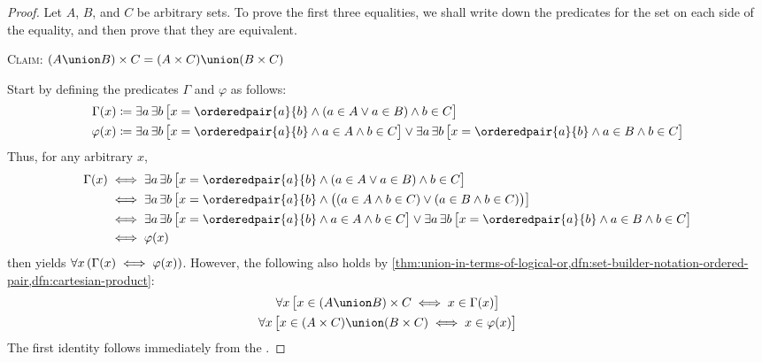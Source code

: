 \begin{proof}
    Let \( A \), \( B \), and \( C \) be arbitrary sets. To prove the first three equalities,
    we shall write down the predicates for the set on each side of the equality, and then
    prove that they are equivalent.

    \vspace{0.3cm}
    \noindent
    {\scshape Claim}: \( \mleft( A \union B \mright) \times C = \mleft( A \times C \mright) \union \mleft( B \times C \mright) \)

    \vspace{0.1cm}
    \noindent
    Start by defining the predicates \( \Gamma \) and \( \varphi \) as follows:
    \begin{align*}
        \Gamma(x)
        &\coloneq
        \exists a \, \exists b \, \big[ x = \orderedpair{a}{b} \land \mleft( a \in A \lor a \in B \mright) \land b \in C \big] \\
        \varphi(x)
        &\coloneq
        \exists a \, \exists b \, \big[ x = \orderedpair{a}{b} \land a \in A \land b \in C \big]
        \lor
        \exists a \, \exists b \, \big[ x = \orderedpair{a}{b} \land a \in B \land b \in C \big]
    \end{align*}
    Thus, for any arbitrary \( x \),
    \begin{equation*}
        \begin{split}
            \Gamma(x)
            &\iff \exists a \, \exists b \, \big[ x = \orderedpair{a}{b} \land \mleft( a \in A \lor a \in B \mright) \land b \in C \big] \\
            &\iff \exists a \, \exists b \, \big[ x = \orderedpair{a}{b} \land
            \big( \mleft( a \in A \land b \in C \mright) \lor \mleft( a \in B \land b \in C \mright) \big) \big] \\
            &\iff \exists a \, \exists b \, \big[ x = \orderedpair{a}{b} \land a \in A \land b \in C \big]
            \lor
            \exists a \, \exists b \, \big[ x = \orderedpair{a}{b} \land a \in B \land b \in C \big]\\
            &\iff \varphi(x)
        \end{split}
    \end{equation*}
     then yields \( \forall x \, \mleft( \Gamma(x) \iff \varphi(x) \mright) \).
    However, the following also holds by \cref{thm:union-in-terms-of-logical-or,dfn:set-builder-notation-ordered-pair,dfn:cartesian-product}:
    \begin{gather*}
        \forall x \, \big[ x \in \mleft( A \union B \mright) \times C \iff x \in \Gamma(x) \big]\\
        \forall x \, \big[ x \in \mleft( A \times C \mright) \union \mleft( B \times C \mright) \iff x \in \varphi(x) \big]
    \end{gather*}
    The first identity follows immediately from the .


\end{proof}
